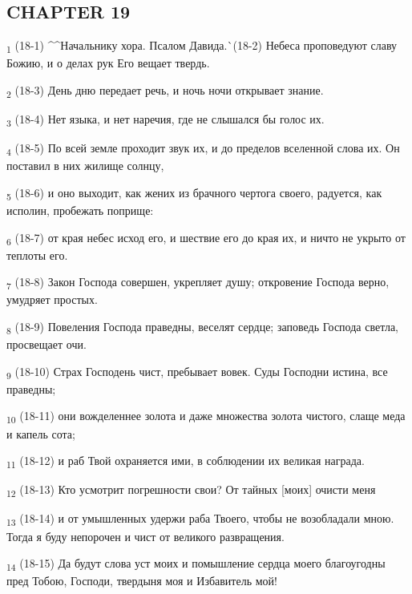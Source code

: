 \subsection{CHAPTER 19}
\begin{tcolorbox}
\textsubscript{1} (18-1) ^^Начальнику хора. Псалом Давида.^^ (18-2) Небеса проповедуют славу Божию, и о делах рук Его вещает твердь.
\end{tcolorbox}
\begin{tcolorbox}
\textsubscript{2} (18-3) День дню передает речь, и ночь ночи открывает знание.
\end{tcolorbox}
\begin{tcolorbox}
\textsubscript{3} (18-4) Нет языка, и нет наречия, где не слышался бы голос их.
\end{tcolorbox}
\begin{tcolorbox}
\textsubscript{4} (18-5) По всей земле проходит звук их, и до пределов вселенной слова их. Он поставил в них жилище солнцу,
\end{tcolorbox}
\begin{tcolorbox}
\textsubscript{5} (18-6) и оно выходит, как жених из брачного чертога своего, радуется, как исполин, пробежать поприще:
\end{tcolorbox}
\begin{tcolorbox}
\textsubscript{6} (18-7) от края небес исход его, и шествие его до края их, и ничто не укрыто от теплоты его.
\end{tcolorbox}
\begin{tcolorbox}
\textsubscript{7} (18-8) Закон Господа совершен, укрепляет душу; откровение Господа верно, умудряет простых.
\end{tcolorbox}
\begin{tcolorbox}
\textsubscript{8} (18-9) Повеления Господа праведны, веселят сердце; заповедь Господа светла, просвещает очи.
\end{tcolorbox}
\begin{tcolorbox}
\textsubscript{9} (18-10) Страх Господень чист, пребывает вовек. Суды Господни истина, все праведны;
\end{tcolorbox}
\begin{tcolorbox}
\textsubscript{10} (18-11) они вожделеннее золота и даже множества золота чистого, слаще меда и капель сота;
\end{tcolorbox}
\begin{tcolorbox}
\textsubscript{11} (18-12) и раб Твой охраняется ими, в соблюдении их великая награда.
\end{tcolorbox}
\begin{tcolorbox}
\textsubscript{12} (18-13) Кто усмотрит погрешности свои? От тайных [моих] очисти меня
\end{tcolorbox}
\begin{tcolorbox}
\textsubscript{13} (18-14) и от умышленных удержи раба Твоего, чтобы не возобладали мною. Тогда я буду непорочен и чист от великого развращения.
\end{tcolorbox}
\begin{tcolorbox}
\textsubscript{14} (18-15) Да будут слова уст моих и помышление сердца моего благоугодны пред Тобою, Господи, твердыня моя и Избавитель мой!
\end{tcolorbox}
